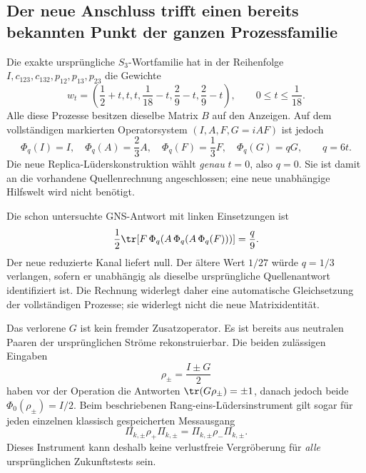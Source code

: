 \subsection{Der neue Anschluss trifft einen bereits bekannten Punkt der ganzen Prozessfamilie}
Die exakte ursprüngliche $S_3$-Wortfamilie hat in der Reihenfolge
$I,c_{123},c_{132},p_{12},p_{13},p_{23}$ die Gewichte
\begin{equation}
w_t=\left(\frac12+t,t,t,\frac1{18}-t,
\frac29-t,\frac29-t\right),\qquad 0\le t\le\frac1{18}.
\end{equation}
Alle diese Prozesse besitzen dieselbe Matrix $B$ auf den Anzeigen. Auf dem vollständigen markierten Operatorsystem $(I,A,F,G=iAF)$ ist jedoch
\begin{equation}
\Phi_q(I)=I,\quad \Phi_q(A)=\frac23A,\quad
\Phi_q(F)=\frac13F,\quad \Phi_q(G)=qG,\qquad q=6t.
\end{equation}
Die neue Replica-Lüderskonstruktion wählt \emph{genau} $t=0$, also $q=0$. Sie ist damit an die vorhandene Quellenrechnung angeschlossen; eine neue unabhängige Hilfswelt wird nicht benötigt.

Die schon untersuchte GNS-Antwort mit linken Einsetzungen ist
\begin{equation}
\frac12\tr\!\left[
F\,\Phi_q\!\left(A\,\Phi_q\!\left(A\,\Phi_q(F)\right)\right)\right]
=\frac q9.
\end{equation}
Der neue reduzierte Kanal liefert null. Der ältere Wert $1/27$ würde $q=1/3$ verlangen, sofern er unabhängig als dieselbe ursprüngliche Quellenantwort identifiziert ist. Die Rechnung widerlegt daher eine automatische Gleichsetzung der vollständigen Prozesse; sie widerlegt nicht die neue Matrixidentität.

Das verlorene $G$ ist kein fremder Zusatzoperator. Es ist bereits aus neutralen Paaren der ursprünglichen Ströme rekonstruierbar. Die beiden zulässigen Eingaben
\begin{equation}
\rho_\pm=\frac{I\pm G}{2}
\end{equation}
haben vor der Operation die Antworten $\tr(G\rho_\pm)=\pm1$, danach jedoch beide $\Phi_0(\rho_\pm)=I/2$.
Beim beschriebenen Rang-eins-Lüdersinstrument gilt sogar für jeden einzelnen klassisch gespeicherten Messausgang
\begin{equation}
\Pi_{k,\pm}\rho_+\Pi_{k,\pm}
=\Pi_{k,\pm}\rho_-\Pi_{k,\pm}.
\end{equation}
Dieses Instrument kann deshalb keine verlustfreie Vergröberung für \emph{alle} ursprünglichen Zukunftstests sein.

